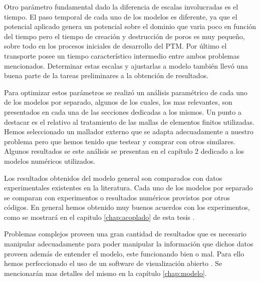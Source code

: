 Otro parámetro fundamental dado la diferencia de escalas involucradas es el tiempo. El paso temporal de cada uno de los modelos es diferente, ya que el potencial aplicado genera un potencial sobre el dominio que varia poco en función del tiempo pero el tiempo de creación y destrucción de poros es muy pequeño, sobre todo en los procesos iniciales de desarrollo del PTM. Por último el transporte posee un tiempo característico intermedio entre ambos problemas mencionados. Determinar estas escalas y ajustarlas a modelo también llevó una buena parte de la tareas preliminares a la obtención de resultados.

Para optimizar estos parámetros se realizó un análisis paramétrico de cada uno de los modelos por separado, algunos de los cuales, los mas relevantes, son presentados en cada una de las secciones dedicadas a los mismos. 
Un punto a destacar es el relativo al tratamiento de las mallas de elementos finitos utilizadas. Hemos seleccionado un mallador externo \cite{automesh} que se adapta adecuadamente a nuestro problema pero que hemos tenido que testear y comprar con otros similares. Algunos resultados se este análisis se presentan en el capítulo 2 dedicado a los modelos numéricos utilizados.

Los resultados obtenidos del modelo general son comparados con datos experimentales existentes en la literatura. Cada uno de los modelos por separado se comparan con experimentos o resultados numéricos provistos por otros códigos. En general hemos obtenido muy buenos acuerdos con los experimentos, como se mostrará en el capitulo \ref{chap:acoplado} de esta tesis \cite{c6-fodava, krass07, c8}.

 Problemas complejos proveen una gran cantidad de resultados que es necesario manipular adecuadamente para poder manipular la información que dichos datos proveen además de entender el modelo, este funcionando bien o mal. Para ello hemos perfeccionado el uso de un software de visualización abierto \cite{c16}. Se mencionarán mas detalles del mismo en la capítulo \ref{chap:modelo}.
